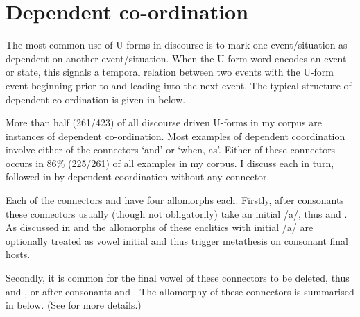 \section{Dependent co-ordination}\label{sec:DepCoo}
The most common use of U-forms in discourse is to mark one event/situation
as dependent on another event/situation.
When the U-form word encodes an event or state,
this signals a temporal relation between two events
with the U-form event beginning prior to and leading into the next event.
The typical structure of dependent co-ordination is given in  below.

\begin{exe}
	\label{ex:ChrCoo}
\end{exe}

More than half (261/423) of all discourse driven U-forms in my corpus
are instances of dependent co-ordination.
Most examples of dependent coordination involve either of
the connectors  `and' or   `when, as'.
Either of these connectors occurs in 86{\%} (225/261) of all examples in my corpus.
I discuss each in turn, followed in 
by dependent coordination without any connector.

Each of the connectors  and  have four allomorphs each.
Firstly, after consonants these connectors usually
(though not obligatorily) take an initial /a/, thus  and .
As discussed in  and 
the allomorphs of these enclitics with initial /a/ are optionally
treated as vowel initial and thus trigger metathesis on consonant final hosts.

Secondly, it is common for the final vowel of these connectors
to be deleted, thus  and , or after consonants  and .
The allomorphy of these connectors is summarised in  below.
(See  for more details.)

\begin{exe}\let\eachwordone=\textnormal
	\label{ex:ConAll}
\end{exe}

